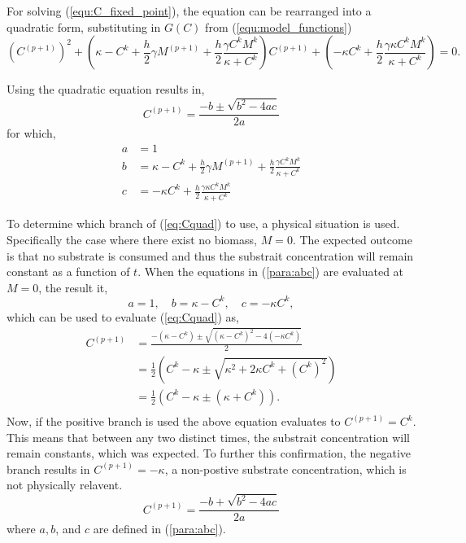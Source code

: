 For solving (\ref{equ:C_fixed_point}), the equation can be rearranged into a quadratic form, substituting in $G(C)$ from (\ref{equ:model_functions})
\begin{equation}
  \left(C^{(p+1)}\right)^2 + \left( \kappa - C^k + \frac{h}{2} \gamma M^{(p+1)} + \frac{h}{2} \frac{ \gamma C^k M^k}{\kappa + C^k} \right) C^{(p+1)} + \left( -\kappa C^k + \frac{h}{2} \frac{\gamma \kappa C^k M^k}{\kappa + C^k} \right) = 0.
\end{equation}

Using the quadratic equation results in, 
  \begin{equation} \label{eq:Cquad}
    C^{(p+1)} = \frac{-b \pm \sqrt{b^2 - 4ac}}{2a}
  \end{equation}  
  for which, 
  \begin{equation} \begin{aligned} \label{para:abc}
    a &= 1\\
    b &= \kappa - C^k + \frac{h}{2} \gamma M^{(p+1)} + \frac{h}{2} \frac{\gamma C^k M^k}{\kappa + C^k} \\
    c &= -\kappa C^k + \frac{h}{2} \frac{\gamma \kappa C^k M^k}{\kappa + C^k}
  \end{aligned}  \end{equation}
  
  To determine which branch of (\ref{eq:Cquad}) to use, a physical situation is used. 
  Specifically the case where there exist no biomass, $M = 0$. 
  The expected outcome is that no substrate is consumed and thus the substrait concentration will remain constant as a function of $t$. 
  When the equations in (\ref{para:abc}) are evaluated at $M = 0$, the result it,
  \begin{equation}
    a = 1, \quad b = \kappa - C^k, \quad c = -\kappa C^k,
  \end{equation} 
  which can be used to evaluate (\ref{eq:Cquad}) as,
  \begin{equation} \begin{aligned}
    C^{(p+1)} &= \frac{- (\kappa - C^k) \pm \sqrt{(\kappa - C^k)^2 - 4 (-\kappa C^k)}}{2} \\
      &= \frac{1}{2} \left( C^k - \kappa \pm \sqrt{\kappa^2 + 2 \kappa C^k + \left(C^k \right) ^2}\right) \\
      &= \frac{1}{2} \left( C^k - \kappa \pm (\kappa+C^k) \right). \\
  \end{aligned} \end{equation}
  Now, if the positive branch is used the above equation evaluates to $C^{(p+1)} = C^k$. 
  This means that between any two distinct times, the substrait concentration will remain constants, which was expected. 
  To further this confirmation, the negative branch results in $C^{(p+1)} = -\kappa $, a non-postive substrate concentration, which is not physically relavent. 
  \begin{equation}
    C^{(p+1)} = \frac{-b + \sqrt{b^2 - 4ac}}{2a}
  \end{equation} 
  where $a,b$, and $c$ are defined in (\ref{para:abc}).


